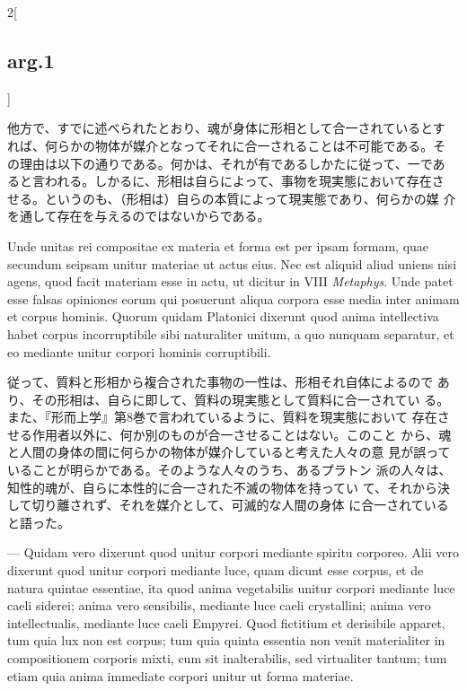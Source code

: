 \documentclass[paper=a4paper,fontsize=10pt,jafontsize=9pt,titlepage]{jlreq}
\begin{document}
\begin{paracol}{2}[\subsection{arg.1}]
\switchcolumn

他方で、すでに述べられたとおり、魂が身体に形相として合一されているとす
れば、何らかの物体が媒介となってそれに合一されることは不可能である。そ
の理由は以下の通りである。何かは、それが有であるしかたに従って、一であ
ると言われる。しかるに、形相は自らによって、事物を現実態において存在さ
せる。というのも、（形相は）自らの本質によって現実態であり、何らかの媒
介を通して存在を与えるのではないからである。

\switchcolumn*

 Unde unitas rei compositae ex materia et forma est per ipsam formam,
 quae secundum seipsam unitur materiae ut actus eius. Nec est aliquid
 aliud uniens nisi agens, quod facit materiam esse in actu, ut dicitur
 in VIII {\itshape Metaphys}. Unde patet esse falsas opiniones eorum
 qui posuerunt aliqua corpora esse media inter animam et corpus
 hominis. Quorum quidam Platonici dixerunt quod anima intellectiva
 habet corpus incorruptibile sibi naturaliter unitum, a quo nunquam
 separatur, et eo mediante unitur corpori hominis corruptibili.

\switchcolumn

 従って、質料と形相から複合された事物の一性は、形相それ自体によるので
 あり、その形相は、自らに即して、質料の現実態として質料に合一されてい
 る。また、『形而上学』第8巻で言われているように、質料を現実態において
 存在させる作用者以外に、何か別のものが合一させることはない。このこと
 から、魂と人間の身体の間に何らかの物体が媒介していると考えた人々の意
 見が誤っていることが明らかである。そのような人々のうち、あるプラトン
 派の人々は、知性的魂が、自らに本性的に合一された不滅の物体を持ってい
 て、それから決して切り離されず、それを媒介として、可滅的な人間の身体
 に合一されていると語った。

\switchcolumn*


 --- Quidam vero dixerunt quod unitur corpori mediante spiritu
corporeo. Alii vero dixerunt quod unitur corpori mediante luce, quam
dicunt esse corpus, et de natura quintae essentiae, ita quod anima
vegetabilis unitur corpori mediante luce caeli siderei; anima vero
sensibilis, mediante luce caeli crystallini; anima vero
intellectualis, mediante luce caeli Empyrei. Quod fictitium et
derisibile apparet, tum quia lux non est corpus; tum quia quinta
essentia non venit materialiter in compositionem corporis mixti, cum
sit inalterabilis, sed virtualiter tantum; tum etiam quia anima
immediate corpori unitur ut forma materiae.

\switchcolumn


\end{paracol}
\end{document}
